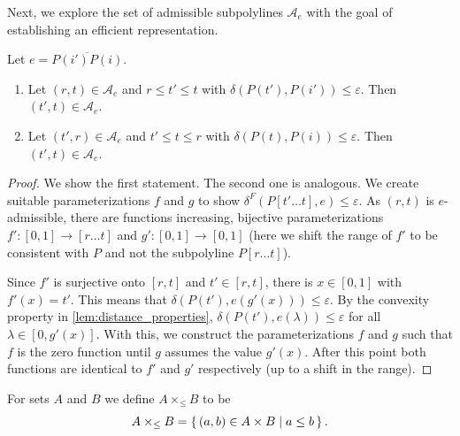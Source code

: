 Next, we explore the set of admissible subpolylines \(\mathcal{A}_e\) with the goal of establishing an efficient representation.

\begin{lemma}\label{lem:admissible_are_intervals}
	Let \(e = \overline{P(i')P(i)}\).
  \begin{enumerate}
		\item Let \((r, t)\in \mathcal{A}_e\) and \(r \leq t' \leq t\) with \(\delta(P(t'), P(i')) \leq \varepsilon\). Then \((t', t) \in \mathcal{A}_e\).
		\item Let \((t', r)\in \mathcal{A}_e\) and \(t' \leq t \leq r\) with \(\delta(P(t), P(i)) \leq \varepsilon\). Then \((t', t) \in \mathcal{A}_e\).
  \end{enumerate}
\end{lemma}

\begin{proof}
	We show the first statement. The second one is analogous. We create suitable parameterizations \(f\) and \(g\) to show \(\delta^F(P[t' \dots t], e) \leq \varepsilon\). As \((r,t)\) is \(e\)-admissible, there are functions increasing, bijective parameterizations \(f':[0,1] \to [r \dots t]\) and \(g':[0,1] \to [0,1]\) (here we shift the range of \(f'\) to be consistent with \(P\) and not the subpolyline \(P[r \dots t]\)).

	Since \(f'\) is surjective onto \([r, t]\) and \(t' \in [r, t]\), there is \(x \in [0, 1]\) with \(f'(x) = t'\). This means that \(\delta(P(t'), e(g'(x))) \leq \varepsilon\). By the convexity property in \cref{lem:distance_properties}, \(\delta(P(t'), e(\lambda)) \leq \varepsilon\) for all \(\lambda \in [0, g'(x)]\). With this, we construct the parameterizations \(f\) and \(g\) such that \(f\) is the zero function until \(g\) assumes the value \(g'(x)\). After this point both functions are identical to \(f'\) and \(g'\) respectively (up to a shift in the range).
\end{proof}

\begin{definition}
	For sets \(A\) and \(B\) we define \(A \times_{\leq} B\) to be 
		\[A \times_{\leq} B = \set{(a, b) \in A \times B \mid a \leq b}.\]
\end{definition}

